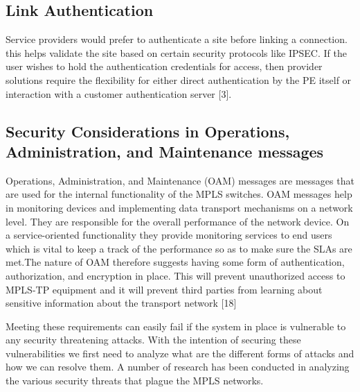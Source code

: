 \subsection*{Link Authentication}
Service providers would prefer to authenticate a site before linking a connection. this helps validate the site based on certain security protocols like IPSEC. If the user wishes to hold the authentication credentials for access, then provider solutions require the flexibility for either direct
authentication by the PE itself or interaction with a customer authentication server [3].

\subsection*{Security Considerations in Operations, Administration, and Maintenance messages}
Operations, Administration, and Maintenance (OAM) messages are messages that are used for the internal functionality of the MPLS switches. OAM messages help in monitoring devices and implementing data transport mechanisms on a network level. They are responsible for the overall performance of the network device. On a service-oriented functionality they provide monitoring services to end users which is vital to keep a track of the performance so as to make sure the SLAs are met.The nature of OAM therefore suggests having some form of authentication, authorization, and encryption in place. This will prevent unauthorized access to MPLS-TP equipment and it will prevent third parties from learning about sensitive information about the transport network [18]

Meeting these requirements can easily fail if the system in place is vulnerable to any security threatening attacks. With the intention of securing these vulnerabilities we first need to analyze what are the different forms of attacks and how we can resolve them. A number of research has been conducted in analyzing the various security threats that plague the MPLS networks.

